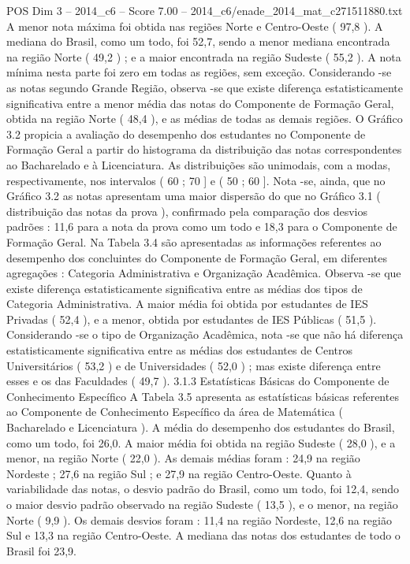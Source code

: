 \begin{textsample}{POS Dim 3 – 2014\_c6 – Score 7.00 – 2014\_c6/enade\_2014\_mat\_c271511880.txt}
A menor nota máxima foi obtida nas regiões Norte e Centro-Oeste ( 97,8 ).
A mediana do Brasil, como um todo, foi 52,7, sendo a menor mediana encontrada na região Norte ( 49,2 ) ; e a maior encontrada na região Sudeste ( 55,2 ).
A nota mínima nesta parte foi zero em todas as regiões, sem exceção.
Considerando -se as notas segundo Grande Região, observa -se que existe diferença estatisticamente significativa entre a menor média das notas do Componente de Formação Geral, obtida na região Norte ( 48,4 ), e as médias de todas as demais regiões.
O Gráfico 3.2 propicia a avaliação do desempenho dos estudantes no Componente de Formação Geral a partir do histograma da distribuição das notas correspondentes ao Bacharelado e à Licenciatura.
As distribuições são unimodais, com a modas, respectivamente, nos intervalos ( 60 ; 70 ] e ( 50 ; 60 ].
Nota -se, ainda, que no Gráfico 3.2 as notas apresentam uma maior dispersão do que no Gráfico 3.1 ( distribuição das notas da prova ), confirmado pela comparação dos desvios padrões : 11,6 para a nota da prova como um todo e 18,3 para o Componente de Formação Geral.
Na Tabela 3.4 são apresentadas as informações referentes ao desempenho dos concluintes do Componente de Formação Geral, em diferentes agregações : Categoria Administrativa e Organização Acadêmica.
Observa -se que existe diferença estatisticamente significativa entre as médias dos tipos de Categoria Administrativa.
A maior média foi obtida por estudantes de IES Privadas ( 52,4 ), e a menor, obtida por estudantes de IES Públicas ( 51,5 ).
Considerando -se o tipo de Organização Acadêmica, nota -se que não há diferença estatisticamente significativa entre as médias dos estudantes de Centros Universitários ( 53,2 ) e de Universidades ( 52,0 ) ; mas existe diferença entre esses e os das Faculdades ( 49,7 ). 3.1.3 Estatísticas Básicas do Componente de Conhecimento Específico A Tabela 3.5 apresenta as estatísticas básicas referentes ao Componente de Conhecimento Específico da área de Matemática ( Bacharelado e Licenciatura ).
A média do desempenho dos estudantes do Brasil, como um todo, foi 26,0.
A maior média foi obtida na região Sudeste ( 28,0 ), e a menor, na região Norte ( 22,0 ).
As demais médias foram : 24,9 na região Nordeste ; 27,6 na região Sul ; e 27,9 na região Centro-Oeste.
Quanto à variabilidade das notas, o desvio padrão do Brasil, como um todo, foi 12,4, sendo o maior desvio padrão observado na região Sudeste ( 13,5 ), e o menor, na região Norte ( 9,9 ).
Os demais desvios foram : 11,4 na região Nordeste, 12,6 na região Sul e 13,3 na região Centro-Oeste.
A mediana das notas dos estudantes de todo o Brasil foi 23,9.

\end{textsample}
